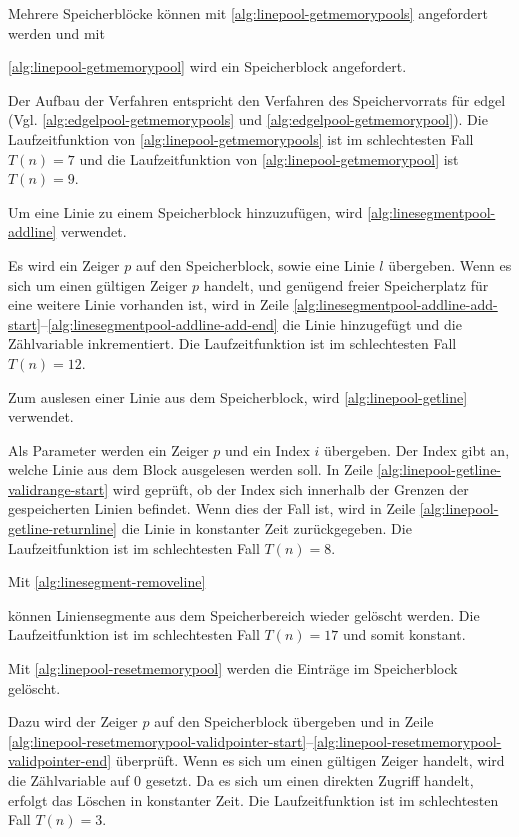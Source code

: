 Mehrere Speicherblöcke können mit \autoref{alg:linepool-getmemorypools} angefordert werden und mit

 \autoref{alg:linepool-getmemorypool} wird ein Speicherblock angefordert.

Der Aufbau der Verfahren entspricht den Verfahren des Speichervorrats für \gls{edgel}
 (Vgl. \autoref{alg:edgelpool-getmemorypools} und \autoref{alg:edgelpool-getmemorypool}).
Die Laufzeitfunktion von \autoref{alg:linepool-getmemorypools} ist im schlechtesten Fall $T(n) = 7$ und die
 Laufzeitfunktion von \autoref{alg:linepool-getmemorypool} ist $T(n) = 9$.

Um eine Linie zu einem Speicherblock hinzuzufügen, wird \autoref{alg:linesegmentpool-addline} verwendet.

Es wird ein Zeiger $p$ auf den Speicherblock, sowie eine Linie $l$ übergeben. Wenn es sich um einen gültigen Zeiger $p$
 handelt, und genügend freier Speicherplatz für eine weitere Linie vorhanden ist, wird in Zeile
 \ref{alg:linesegmentpool-addline-add-start}--\ref{alg:linesegmentpool-addline-add-end} die Linie hinzugefügt und die
 Zählvariable inkrementiert. Die Laufzeitfunktion ist im schlechtesten Fall $T(n) = 12$.

Zum auslesen einer Linie aus dem Speicherblock, wird \autoref{alg:linepool-getline} verwendet.

Als Parameter werden ein Zeiger $p$ und ein Index $i$ übergeben. Der Index gibt an, welche Linie aus dem Block
 ausgelesen werden soll. In Zeile \ref{alg:linepool-getline-validrange-start} wird geprüft, ob der Index sich innerhalb
 der Grenzen der gespeicherten Linien befindet. Wenn dies der Fall ist, wird in Zeile
 \ref{alg:linepool-getline-returnline} die Linie in konstanter Zeit zurückgegeben. Die Laufzeitfunktion ist im schlechtesten Fall $T(n) = 8$.

Mit \autoref{alg:linesegment-removeline}

können Liniensegmente aus dem Speicherbereich wieder gelöscht werden. Die Laufzeitfunktion ist im schlechtesten Fall
 $T(n) = 17$ und somit konstant.

Mit \autoref{alg:linepool-resetmemorypool} werden die Einträge im Speicherblock gelöscht.

Dazu wird der Zeiger $p$ auf den Speicherblock übergeben und in Zeile
 \ref{alg:linepool-resetmemorypool-validpointer-start}--\ref{alg:linepool-resetmemorypool-validpointer-end} überprüft.
 Wenn es sich um einen gültigen Zeiger handelt, wird die Zählvariable auf $0$ gesetzt. Da es sich um einen direkten
 Zugriff handelt, erfolgt das Löschen in konstanter Zeit. Die Laufzeitfunktion ist im schlechtesten Fall $T(n) = 3$.


